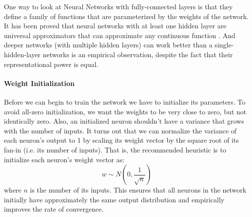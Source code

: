 \documentclass[10pt,twocolumn,letterpaper]{article}
\begin{document}
	One way to look at Neural Networks with fully-connected layers is that they define a family of functions that are parameterized by the weights of the network. It has been proved that neural networks with at least one hidden layer are universal approximators that can approximate any continuous function \cite{sigmoid}. And deeper networks (with multiple hidden layers) can work better than a single-hidden-layer networks is an empirical observation, despite the fact that their representational power is equal.

\paragraph{Weight Initialization}
	Before we can begin to train the network we have to initialize its parameters. To avoid all-zero initialization, we want the weights to be very close to zero, but not identically zero. Also, an initialized neuron shouldn't have a variance that grows with the number of inputs. It turns out that we can normalize the variance of each neuron's output to 1 by scaling its weight vector by the square root of its fan-in (i.e. its number of inputs). That is, the recommended heuristic is to initialize each neuron's weight vector as:
\begin{equation}
	w \sim N\left(0, \frac{1}{\sqrt{n}}\right)
\end{equation}
	where $n$ is the number of its inputs. This ensures that all neurons in the network initially have approximately the same output distribution and empirically improves the rate of convergence. \cite{weightInit}
\end{document}
